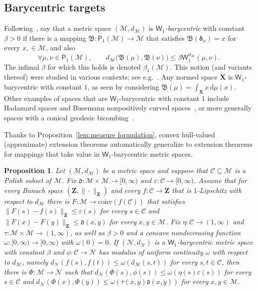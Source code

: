 \documentclass[11pt,reqno]{amsart}
\renewcommand{\le}{\leqslant}
\newcommand{\ud}[0]{\,\mathrm{d}}
\newcommand{\bd}{\boldsymbol{\delta}}
\newcommand{\NN}{\mathcal{N}}
\newcommand{\X}{\mathbf X}
\renewcommand{\bd}{\boldsymbol{\delta}}
\newcommand{\e}{\varepsilon}
\newtheorem{proposition}[theorem]{Proposition}
\theoremstyle{remark}
\newcommand{\MM}{\mathcal{M}}
\renewcommand{\subset}{\subseteq}
\newcommand{\W}{\mathsf{W}}
\newcommand{\bfZ}{\mathbf{Z}}
\newcommand{\sub}{\mathscr{C}}
\renewcommand{\1}{\mathbf 1}
\newcommand{\conv}{\mathrm{conv}}
\begin{document}
\subsection{Barycentric targets}\label{sec:bary} Following~\cite{MN13-bary}, say that a metric space $(\MM,d_\MM)$ is  {\em $\W_1$-barycentric}  with constant $\beta>0$ if there is a mapping $\mathfrak{B}:\mathsf{P}_1(\MM)\to \MM$ that satisfies $\mathfrak{B}(\bd_x)=x$ for every $x,\in \MM$, and also
$$
\forall \mu,\nu\in \mathsf{P}_1(\MM),\qquad d_\MM\big(\mathfrak{B}(\mu),\mathfrak{B}(\nu)\big)\le \beta\W_1^{d_\MM}(\mu,\nu).
$$
The infimal $\beta$ for which this holds is denoted $\beta_{1}(\MM)$. This notion (and variants thereof)  were studied in various contexts; see e.g.~\cite{EH99,LPS00,Gro03,Stu03,LN05,Oht09,Aus11,MN13-bary,Nav13,Lim18,Bas18}.  Any normed space $\X$ is $\W_1$-barycentric with constant $1$, as seen by considering $\mathfrak{B}(\mu)=\int_\X x\ud\mu(x)$. Other examples of spaces that are $\W_1$-barycentric with constant $1$ include Hadamard spaces and Busemann nonpositively curved spaces~\cite{BH99}, or more generally spaces with a conical geodesic bicombing~\cite{Des15}.



Thanks to Proposition~\ref{lem:measure formulation}, convex hull-valued (approximate) extension theorems automatically generalize to extension theorems for mappings that take value in $\W_1$-barycentric metric spaces.




\begin{proposition}\label{prop:pass to bary} Let $(\MM,d_\MM)$ be a metric space and suppose that $\sub\subset \MM$  is a Polish subset of $\MM$. Fix $\mathfrak{d}:\MM\times \MM\to [0,\infty)$ and $\e:\sub\to [0,\infty)$. Assume that for every Banach space $(\bfZ,\|\cdot\|_\bfZ)$ and every $f:\sub\to \bfZ$ that is $1$-Lipschitz with respect to $d_\MM$ there is $F:\MM\to \overline{\conv}(f(\sub))$ that satisfies $\|F(s)-f(s)\|_\bfZ\le \e(s)$ for every $s\in \sub$ and $\|F(x)-F(y)\|_\bfZ\le \mathfrak{d}(x,y)$ for every $x,y\in \MM$.
Fix $\eta:\sub \to (1,\infty)$ and $\tau:\MM\times \MM\to (1,\infty)$, as well as $\beta>0$ and a concave nondecreasing function $\omega:[0,\infty)\to [0,\infty)$ with $\omega(0)=0$. If $(\NN,d_\NN)$ is a $\W_1$-barycentric metric space with constant $\beta$ and $\phi:\sub\to \NN$ has modulus of uniform continuity $\omega$ with respect to $d_\MM$, namely $d_\NN(f(s),f(t))\le \omega(d_\MM(s,t))$ for every $s,t\in \sub$, then there is $\Phi:\MM\to \NN$ such that $d_\NN(\Phi(s),\phi(s))\le \omega(\eta(s)\e(s))$ for every $s\in \sub$ and $d_\NN(\Phi(x),\Phi(y))\le \omega (\tau(x,y)\mathfrak{d}(x,y))$ for every $x,y\in \MM$.
\end{proposition}
\end{document}
